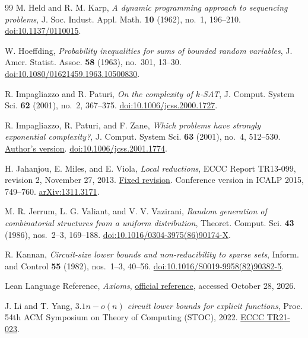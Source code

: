 \documentclass[11pt,reqno]{amsart}
\numberwithin{equation}{section}
\theoremstyle{plain}
\theoremstyle{definition}
\theoremstyle{remark}
\begin{document}
\begin{thebibliography}{99}
M. Held and R. M. Karp, \emph{A dynamic programming approach to sequencing
problems}, J. Soc. Indust. Appl. Math. \textbf{10} (1962), no.~1, 196--210.
\href{https://doi.org/10.1137/0110015}{doi:10.1137/0110015}.

W. Hoeffding, \emph{Probability inequalities for sums of bounded random
variables}, J. Amer. Statist. Assoc. \textbf{58} (1963), no.~301, 13--30.
\href{https://doi.org/10.1080/01621459.1963.10500830}{doi:10.1080/01621459.1963.10500830}.

R. Impagliazzo and R. Paturi, \emph{On the complexity of $k$-SAT},
J. Comput. System Sci. \textbf{62} (2001), no.~2, 367--375.
\href{https://doi.org/10.1006/jcss.2000.1727}{doi:10.1006/jcss.2000.1727}.

R. Impagliazzo, R. Paturi, and F. Zane, \emph{Which problems have strongly
exponential complexity?}, J. Comput. System Sci. \textbf{63} (2001), no.~4,
512--530.
\href{https://cseweb.ucsd.edu/~paturi/myPapers/pubs/ImpagliazzoPaturiZane_2001_jcss.pdf}{Author's version}.
\href{https://doi.org/10.1006/jcss.2001.1774}{doi:10.1006/jcss.2001.1774}.

H. Jahanjou, E. Miles, and E. Viola, \emph{Local reductions}, ECCC Report
TR13-099, revision 2, November 27, 2013.
\href{https://eccc.weizmann.ac.il/report/2013/099/revision/2/download/}{Fixed revision}.
Conference version in ICALP 2015, 749--760.
\href{https://arxiv.org/abs/1311.3171}{arXiv:1311.3171}.

M. R. Jerrum, L. G. Valiant, and V. V. Vazirani, \emph{Random generation of
combinatorial structures from a uniform distribution}, Theoret. Comput. Sci.
\textbf{43} (1986), nos.~2--3, 169--188.
\href{https://doi.org/10.1016/0304-3975(86)90174-X}{doi:10.1016/0304-3975(86)90174-X}.

R. Kannan, \emph{Circuit-size lower bounds and non-reducibility to sparse
sets}, Inform. and Control \textbf{55} (1982), nos.~1--3, 40--56.
\href{https://doi.org/10.1016/S0019-9958(82)90382-5}{doi:10.1016/S0019-9958(82)90382-5}.

Lean Language Reference, \emph{Axioms},
\href{https://lean-lang.org/doc/reference/latest/Axioms/}{official reference},
accessed October 28, 2026.

J. Li and T. Yang, \emph{$3.1n-o(n)$ circuit lower bounds for explicit
functions}, Proc. 54th ACM Symposium on Theory of Computing (STOC), 2022.
\href{https://eccc.weizmann.ac.il/report/2021/023/}{ECCC TR21-023}.


\end{thebibliography}
\end{document}
